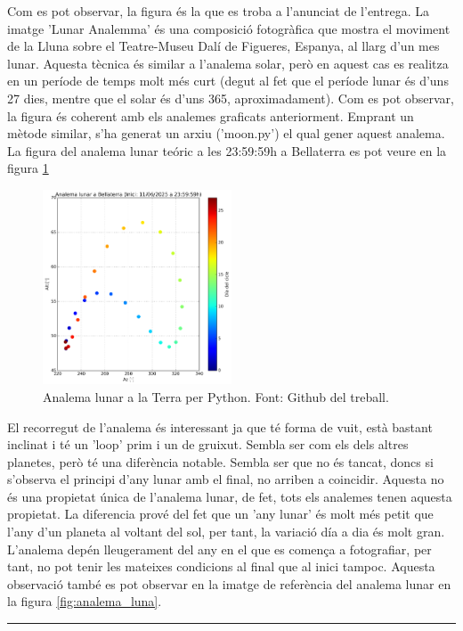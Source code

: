\documentclass[a4paper, 11pt]{article}
\begin{document}
\vspace{2mm}

\noindent Com es pot observar, la figura és la que es troba a l'anunciat de l'entrega. La imatge 'Lunar Analemma' és una composició fotogràfica que mostra el moviment de la Lluna sobre el Teatre-Museu Dalí de Figueres, Espanya, al llarg d'un mes lunar. Aquesta tècnica és similar a l'analema solar, però en aquest cas es realitza en un període de temps molt més curt (degut al fet que el període lunar és d'uns 27 dies, mentre que el solar és d'uns 365, aproximadament). Com es pot observar, la figura és coherent amb els analemes graficats anteriorment. Emprant un mètode similar, s'ha generat un arxiu ('moon.py') el qual gener aquest analema. La figura del analema lunar teóric a les 23:59:59h a Bellaterra es pot veure en la figura \ref{fig:lluna}

\begin{figure}[h!]
    \centering
    \includegraphics[width=0.50\textwidth]{images/analema_lluna.png}
    \caption{Analema lunar a la Terra per Python. Font: Github del treball.}
    \label{fig:lluna}
\end{figure}
\vspace{2mm}

\noindent El recorregut de l'analema és interessant ja que té forma de vuit, està bastant inclinat i té un 'loop' prim i un de gruixut. Sembla ser com els dels altres planetes, però té una diferència notable. Sembla ser que no és tancat, doncs si s'observa el principi d'any lunar amb el final, no arriben a coincidir. Aquesta no és una propietat única de l'analema lunar, de fet, tots els analemes tenen aquesta propietat. La diferencia prové del fet que un 'any lunar' és molt més petit que l'any d'un planeta al voltant del sol, per tant, la variació día a dia és molt gran. L'analema depén lleugerament del any en el que es comença a fotografiar, per tant, no pot tenir les mateixes condicions al final que al inici tampoc. Aquesta observació també es pot observar en la imatge de referència del analema lunar en la figura \ref{fig:analema_luna}.


\vspace{10mm}
\hrule\
\vspace{5mm}




\newpage
\printbibliography
\end{document}

